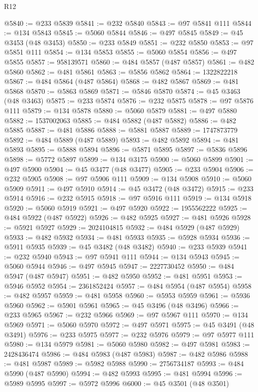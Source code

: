 \begin{lexlean}{R12}
\begin{coremodule}
@5840 := @233 @5839
@5841 := @232 @5840
@5843 := @97 @5841 @111
@5844 := @134 @5843
@5845 := @5060 @5844
@5846 := @497 @5845
@5849 := @45 @3453 (@48 @3453)
@5850 := @233 @5849
@5851 := @232 @5850
@5853 := @97 @5851 @111
@5854 := @134 @5853
@5855 := @5060 @5854
@5856 := @497 @5855
@5857 := 958139571
@5860 := @484 @5857 (@487 @5857)
@5861 := @482 @5860
@5862 := @481 @5861
@5863 := @5856 @5862
@5864 := 1322822218
@5867 := @484 @5864 (@487 @5864)
@5868 := @482 @5867
@5869 := @481 @5868
@5870 := @5863 @5869
@5871 := @5846 @5870
@5874 := @45 @3463 (@48 @3463)
@5875 := @233 @5874
@5876 := @232 @5875
@5878 := @97 @5876 @111
@5879 := @134 @5878
@5880 := @5060 @5879
@5881 := @497 @5880
@5882 := 1537002063
@5885 := @484 @5882 (@487 @5882)
@5886 := @482 @5885
@5887 := @481 @5886
@5888 := @5881 @5887
@5889 := 1747873779
@5892 := @484 @5889 (@487 @5889)
@5893 := @482 @5892
@5894 := @481 @5893
@5895 := @5888 @5894
@5896 := @5871 @5895
@5897 := @5836 @5896
@5898 := @5772 @5897
@5899 := @134 @3175
@5900 := @5060 @5899
@5901 := @497 @5900
@5904 := @45 @3477 (@48 @3477)
@5905 := @233 @5904
@5906 := @232 @5905
@5908 := @97 @5906 @111
@5909 := @134 @5908
@5910 := @5060 @5909
@5911 := @497 @5910
@5914 := @45 @3472 (@48 @3472)
@5915 := @233 @5914
@5916 := @232 @5915
@5918 := @97 @5916 @111
@5919 := @134 @5918
@5920 := @5060 @5919
@5921 := @497 @5920
@5922 := 1955562222
@5925 := @484 @5922 (@487 @5922)
@5926 := @482 @5925
@5927 := @481 @5926
@5928 := @5921 @5927
@5929 := 2024104815
@5932 := @484 @5929 (@487 @5929)
@5933 := @482 @5932
@5934 := @481 @5933
@5935 := @5928 @5934
@5936 := @5911 @5935
@5939 := @45 @3482 (@48 @3482)
@5940 := @233 @5939
@5941 := @232 @5940
@5943 := @97 @5941 @111
@5944 := @134 @5943
@5945 := @5060 @5944
@5946 := @497 @5945
@5947 := 2227730452
@5950 := @484 @5947 (@487 @5947)
@5951 := @482 @5950
@5952 := @481 @5951
@5953 := @5946 @5952
@5954 := 2361852424
@5957 := @484 @5954 (@487 @5954)
@5958 := @482 @5957
@5959 := @481 @5958
@5960 := @5953 @5959
@5961 := @5936 @5960
@5962 := @5901 @5961
@5965 := @45 @3496 (@48 @3496)
@5966 := @233 @5965
@5967 := @232 @5966
@5969 := @97 @5967 @111
@5970 := @134 @5969
@5971 := @5060 @5970
@5972 := @497 @5971
@5975 := @45 @3491 (@48 @3491)
@5976 := @233 @5975
@5977 := @232 @5976
@5979 := @97 @5977 @111
@5980 := @134 @5979
@5981 := @5060 @5980
@5982 := @497 @5981
@5983 := 2428436474
@5986 := @484 @5983 (@487 @5983)
@5987 := @482 @5986
@5988 := @481 @5987
@5989 := @5982 @5988
@5990 := 2756734187
@5993 := @484 @5990 (@487 @5990)
@5994 := @482 @5993
@5995 := @481 @5994
@5996 := @5989 @5995
@5997 := @5972 @5996
@6000 := @45 @3501 (@48 @3501)

\end{coremodule}
\end{lexlean}
